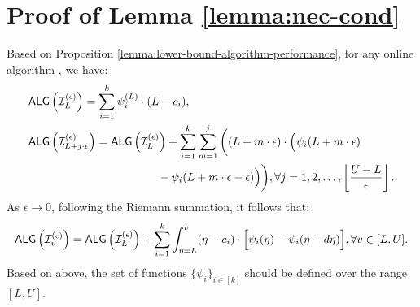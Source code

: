 \section{Proof of Lemma \ref{lemma:nec-cond}}
\label{apx:lb-system-ode}
Based on Proposition \ref{lemma:lower-bound-algorithm-performance}, for any online algorithm \ALG, we have: 
\begin{align*}
&\ALG \left(\mathcal{I}_{L}^{(\epsilon)}\right) = \sum_{i=1}^{k} \psi_i^{(L)} \cdot (L - c_i), \\
&\ALG\left(\mathcal{I}_{L+ j\cdot \epsilon}^{(\epsilon)}\right) =  \ALG\left(\mathcal{I}_{L}^{(\epsilon)}\right) +  \sum_{i=1}^{k} \sum_{m=1}^{j} \bigg((L + m \cdot \epsilon) \cdot  \Big(\psi_i(L + m \cdot \epsilon) \\
& \hspace{+4cm} - \psi_i(L + m \cdot \epsilon - \epsilon) \Big)  \bigg), \forall j = 1, 2, \ldots, \left\lfloor \frac{U - L}{\epsilon} \right\rfloor.
\end{align*}
As $\epsilon \rightarrow 0$, following the Riemann summation, it follows that:
\begin{align*}
    \textsf{ALG}\left(\mathcal{I}_{v}^{(\epsilon)}\right) 
    = \textsf{ALG}\left(\mathcal{I}_{L}^{(\epsilon)}\right) + \sum_{i=1}^{k} \int_{\eta = L}^{v} (\eta-c_i) \cdot \Big[ \psi_i(\eta) - \psi_i(\eta - d\eta) \Big], \forall v \in [L,U].
\end{align*}
Based on above, the set of functions $\{\psi_i\}_{i \in [k]}$ should be defined over the range $[L,U]$. 

